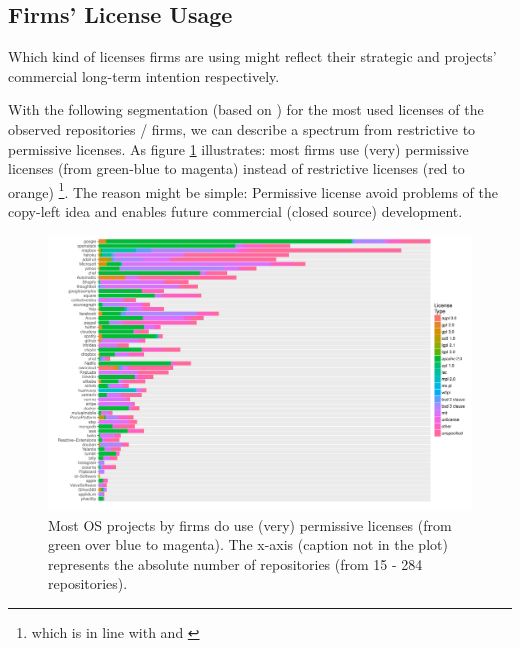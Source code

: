 
\subsection{Firms' License Usage}
\label{sec:firms_and_licenses}

Which kind of licenses firms are using might reflect their strategic and projects' commercial long-term intention respectively.

With the following segmentation (based on \cite{bonaccorsi2003licensing}) for the most used licenses of the observed repositories / firms, we can describe a spectrum from restrictive to permissive licenses. As figure \ref{fig:licenses_used_by_firms} illustrates: most firms use (very) permissive licenses (from green-blue to magenta) instead of restrictive licenses (red to orange) \footnote{which is in line with \cite{bonaccorsi2003licensing} and \cite{top20oslicenses:online}}. The reason might be simple: Permissive license avoid problems of the copy-left idea and enables future commercial (closed source) development.

\begin{figure}[!h]
	\centering
	\includegraphics[page=1,scale=0.3]{../graphics/intro/which_firm_is_using_which_license.pdf}
	\caption{Most OS projects by firms do use (very) permissive licenses (from green over blue to magenta). The x-axis (caption not in the plot) represents the absolute number of repositories (from 15 - 284 repositories).}
	\label{fig:licenses_used_by_firms}
\end{figure}

